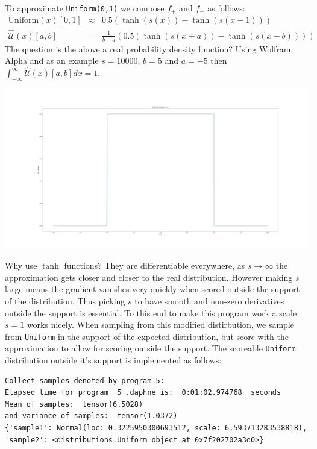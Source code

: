 \documentclass[]{article}
\begin{document}
To approximate \texttt{Uniform(0,1)} we compose $f_{+}$ and $f_{-}$ as follows:
\begin{equation}\begin{array}{rcl}
\text{Uniform}(x)[0,1] &\approx& 0.5\left(\tanh(s(x)) - \tanh(s(x-1))\right)\\
\hat{\mathcal{U}}(x)[a,b] &=& \frac{1}{b-a}\left(0.5\left(\tanh(s(x+a)) - \tanh(s(x-b))\right)\right)
\end{array}\end{equation}
The question is the above a real probability density function? Using Wolfram Alpha and as an example $s = 10000$, $b = 5$ and $a = -5$ then $\int_{-\infty}^{\infty}\hat{\mathcal{U}}(x)[a,b]dx = 1$. 
\begin{center}
	\includegraphics[width=\linewidth]{Figures/uniformEst.png}
\end{center}
Why use $\tanh$ functions? They are differentiable everywhere, as $s\rightarrow \infty$ the approximation gets closer and closer to the real distribution. However making $s$ large means the gradient vanishes very quickly when scored outside the support of the distribution. Thus picking $s$ to have smooth and non-zero derivatives outside the support is essential. To this end to make this program work a scale $s=1$ works nicely. When sampling from this modified distirbution, we sample from \texttt{Uniform} in the support of the expected distribution, but score with the approximation to allow for scoring outside the support. The scoreable \texttt{Uniform} distribution outside it's support is implemented as follows:
 
\begin{verbatim}
Collect samples denoted by program 5:
Elapsed time for program  5 .daphne is:  0:01:02.974768  seconds
Mean of samples:  tensor(6.5028)
and variance of samples:  tensor(1.0372)
{'sample1': Normal(loc: 0.3225950300693512, scale: 6.593713283538818), 'sample2': <distributions.Uniform object at 0x7f202702a3d0>}
\end{verbatim}
\end{document}
